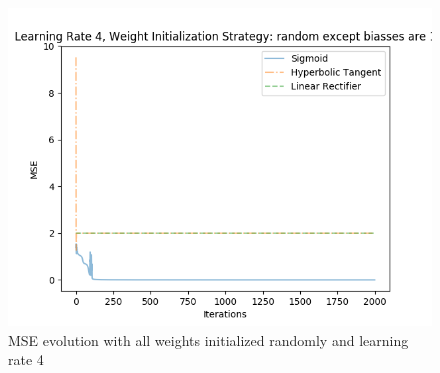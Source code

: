 \documentclass{article}
\begin{document}
\begin{figure}[H]
\centering
\includegraphics[width=0.9\linewidth]{img/mse_randomexceptbiassesare1_4.png}
\caption{MSE evolution with all weights initialized randomly and learning rate 4}
\label{fig:mser4}
\end{figure}
\end{document}
